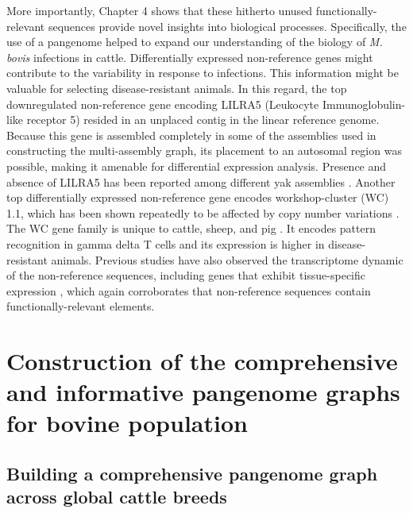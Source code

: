 \documentclass[../main.tex]{subfiles}
\begin{document}
More importantly, Chapter 4 shows that these hitherto unused functionally-relevant sequences provide novel insights into biological processes. Specifically, the use of a pangenome helped to expand our understanding of the biology of \emph{M. bovis} infections in cattle. Differentially expressed non-reference genes might contribute to the variability in response to infections. This information might be valuable for selecting disease-resistant animals. In this regard, the top downregulated non-reference gene encoding LILRA5 (Leukocyte Immunoglobulin-like receptor 5) resided in an unplaced contig in the linear reference genome. Because this gene is assembled completely in some of the assemblies used in constructing the multi-assembly graph, its placement to an autosomal region was possible, making it amenable for differential expression analysis. Presence and absence of LILRA5 has been reported among different yak assemblies \citep{ji2021chromosome}. Another top differentially expressed non-reference gene encodes workshop-cluster (WC) 1.1, which has been shown repeatedly to be affected by copy number variations \citep{liu2010analysis,chen2012gene,bickhart2012copy,Low2020}. The WC gene family is unique to cattle, sheep, and pig \citep{bickhart2014challenges}. It  encodes pattern recognition in gamma delta T cells and its expression is higher in disease-resistant animals. Previous studies have also observed the transcriptome dynamic of the non-reference sequences, including genes that exhibit tissue-specific expression \citep{wong2018novo,wong2020towards,li2019towards}, which again corroborates that non-reference sequences contain functionally-relevant elements. 

\section{Construction of the comprehensive and informative pangenome graphs for bovine population}

\subsection*{Building a comprehensive pangenome graph across global cattle breeds}
\end{document}
